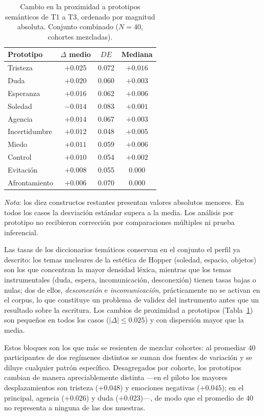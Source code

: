 \documentclass[12pt]{article}
\begin{document}
\begin{table}[htbp]
	\centering
	\caption{Cambio en la proximidad a prototipos semánticos de T1 a T3, ordenado por magnitud
	absoluta. Conjunto combinado ($N = 40$, cohortes mezcladas).}
	\label{tab:prototipos_combinado}
	\begin{tabular}{l c c c}
		\toprule
		Prototipo & $\Delta$ medio & $DE$ & Mediana \\
		\midrule
		Tristeza            & $+0.025$ & 0.072 & $+0.016$ \\
		Duda                & $+0.020$ & 0.060 & $+0.003$ \\
		Esperanza           & $+0.016$ & 0.062 & $+0.006$ \\
		Soledad             & $-0.014$ & 0.083 & $+0.001$ \\
		Agencia             & $+0.014$ & 0.067 & $+0.003$ \\
		Incertidumbre       & $+0.012$ & 0.048 & $+0.005$ \\
		Miedo               & $+0.011$ & 0.059 & $+0.006$ \\
		Control             & $+0.010$ & 0.054 & $+0.002$ \\
		Evitación           & $+0.008$ & 0.055 & $0.000$ \\
		Afrontamiento       & $+0.006$ & 0.070 & $0.000$ \\
		\bottomrule
	\end{tabular}
	\smallskip
	\emph{Nota}: los diez constructos restantes presentan valores absolutos menores. En todos los
	casos la desviación estándar supera a la media. Los análisis por prototipo no recibieron
	corrección por comparaciones múltiples ni prueba inferencial.
\end{table}

Las tasas de los diccionarios temáticos conservan en el conjunto el perfil ya descrito: los
temas nucleares de la estética de Hopper (soledad, espacio, objetos) son los que concentran la
mayor densidad léxica, mientras que los temas instrumentales (duda, espera, incomunicación,
desconexión) tienen tasas bajas o nulas; dos de ellos, \emph{desconexión} e
\emph{incomunicación}, prácticamente no se activan en el corpus, lo que constituye un problema
de validez del instrumento antes que un resultado sobre la escritura. Los cambios de proximidad
a prototipos (Tabla~\ref{tab:prototipos_combinado}) son pequeños en todos los casos
($|\Delta| \leq 0.025$) y con dispersión mayor que la media.

Estos bloques son los que más se resienten de mezclar cohortes: al promediar 40 participantes de
dos regímenes distintos se suman dos fuentes de variación y se diluye cualquier patrón
específico. Desagregados por cohorte, los prototipos cambian de manera apreciablemente distinta
—en el piloto los mayores desplazamientos son tristeza ($+0.048$) y emociones negativas
($+0.045$); en el principal, agencia ($+0.026$) y duda ($+0.023$)—, de modo que el promedio de
40 no representa a ninguna de las dos muestras.
\end{document}
